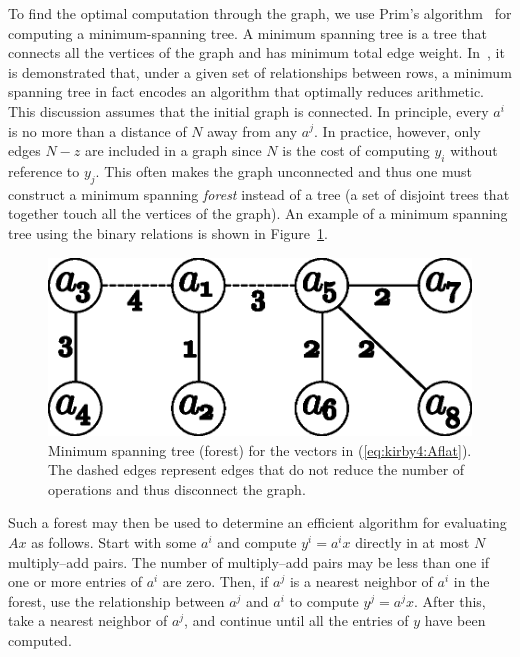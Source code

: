 To find the optimal computation through the graph, we use Prim's
algorithm~\cite{prim} for computing a minimum-spanning tree. A minimum
spanning tree is a tree that connects all the vertices of the graph
and has minimum total edge weight. In~\cite{KirEtAl2006}, it is
demonstrated that, under a given set of relationships between rows, a
minimum spanning tree in fact encodes an algorithm that optimally
reduces arithmetic.  This discussion assumes that the initial graph is
connected. In principle, every \( a^i \) is no more than a distance
of \( N \) away from any \( a^j \). In practice, however, only
edges \( N - z \) are included in a graph since $N$ is the cost of
computing \( y_i \) without reference to \( y_j \). This often makes
the graph unconnected and thus one must construct a minimum
spanning \emph{forest} instead of a tree (a set of disjoint trees that
together touch all the vertices of the graph). An example of a minimum
spanning tree using the binary relations is shown in
Figure~\ref{fig:kirby4:mst}.

\begin{figure}
  \begin{center}
   \includegraphics[width=\smallwidth]{chapters/kirby-4/eps/small_mst.eps}
    \caption{Minimum spanning tree (forest) for the vectors in
      (\ref{eq:kirby4:Aflat}). The dashed edges represent edges that do
    not reduce the number of operations and thus disconnect the graph.}
    \label{fig:kirby4:mst}
  \end{center}
\end{figure}

Such a forest may then be used to determine an efficient algorithm for
evaluating \( A x \) as follows. Start with some \( a^i \) and
compute \( y^i = a^i x \) directly in at most \( N \) multiply--add
pairs. The number of multiply--add pairs may be less than one if one
or more entries of $a^i$ are zero. Then, if \( a^j \) is a nearest
neighbor of \( a^i \) in the forest, use the relationship between \(
a^j \) and \( a^i \) to compute \( y^j = a^j x \).  After this, take a
nearest neighbor of \( a^j \), and continue until all the entries of
\( y \) have been computed.

